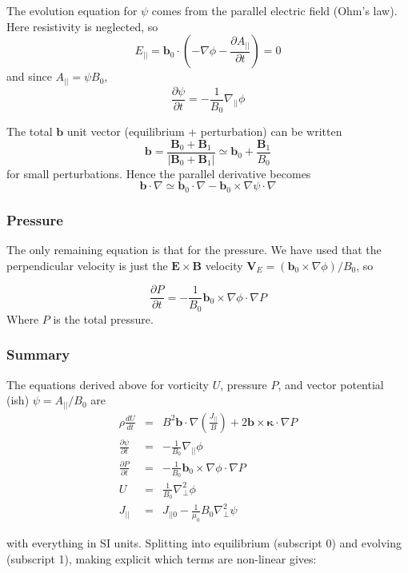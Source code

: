 \documentclass[12pt, a4paper]{article}
\newcommand{\deriv}[2]{\ensuremath{\frac{\partial #1}{\partial #2}}}
\newcommand{\apar}{\ensuremath{A_{||}}}
\newcommand{\Vec}[1]{\ensuremath{\mathbf{#1}}}
\newcommand{\bvec}{\Vec{b}}
\newcommand{\kvec}{\Vec{\kappa}}
\newcommand{\bxk}{\bvec\times\kvec\cdot\nabla}
\newcommand{\Bvec}{\Vec{B}}
\newcommand{\Jpar}{J_{||}}
\newcommand{\delp}{\nabla_\perp^2}
\begin{document}
The evolution equation for $\psi$ comes from the parallel electric field (Ohm's law). Here resistivity
is neglected, so
\[
E_{||} = \bvec_0\cdot\left(-\nabla\phi - \deriv{\apar}{t}\right) = 0
\]
and since $\apar = \psi B_0$,
\begin{equation}
\deriv{\psi}{t} = -\frac{1}{B_0}\nabla_{||}\phi
\label{eq:psievolve}
\end{equation}

The total $\bvec$ unit vector (equilibrium + perturbation) can be written
\[
\bvec = \frac{\Bvec_0 + \Bvec_1}{\left|\Bvec_0 + \Bvec_1\right|} \simeq \bvec_0 + \frac{\Bvec_1}{B_0}
\]
for small perturbations. Hence the parallel derivative becomes
\[
\bvec\cdot\nabla \simeq \bvec_0\cdot\nabla - \bvec_0\times\nabla\psi\cdot\nabla
\]

\subsubsection{Pressure}

The only remaining equation is that for the pressure. We have used that the perpendicular velocity
is just the $\Vec{E\times B}$ velocity $\Vec{V}_E = \left(\bvec_0\times\nabla\phi\right) / B_0$, so 

\begin{equation}
\deriv{P}{t} = -\frac{1}{B_0}\bvec_0\times\nabla\phi\cdot\nabla P
\end{equation}
Where $P$ is the total pressure.

\subsubsection{Summary}
\label{sec:eqsummary}

The equations derived above for vorticity $U$, pressure $P$, and vector potential (ish) $\psi = \apar / B_0 $ are
\begin{eqnarray*}
\rho \frac{dU}{dt} &=& B^2\bvec\cdot\nabla\left(\frac{\Jpar}{B}\right) + 2\bxk P \\
\deriv{\psi}{t} &=& -\frac{1}{B_0}\nabla_{||}\phi \\
\deriv{P}{t} &=& -\frac{1}{B_0}\bvec_0\times\nabla\phi\cdot\nabla P \\
U &=& \frac{1}{B_0}\delp\phi \\
\Jpar &=& J_{||0} - \frac{1}{\mu_0}B_0\delp\psi 
\end{eqnarray*}

with everything in SI units. Splitting into equilibrium (subscript 0) and evolving (subscript 1), 
making explicit which terms are non-linear gives:
\end{document}
